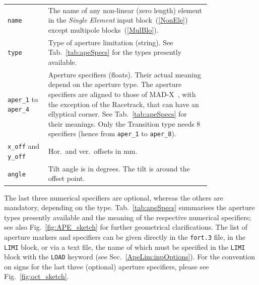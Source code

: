 \begin{longtabu}{@{}lp{0.8\linewidth}}
    \texttt{name}   & The name of any non-linear (zero length) element in the \textit{Single Element} input block~(\ref{NonEle}) except multipole blocks~(\ref{MulBlo}). \\
    \texttt{type}   & Type of aperture limitation (string). See Tab.~\ref{tab:apeSpecs} for the types
                      presently available. \\
    \texttt{aper\_1} to \texttt{aper\_4}  & Aperture specifiers (floats).
                      Their actual meaning depend on the aperture type. The aperture specifiers are
                      aligned to those of MAD-X~\cite{MAD}, with the exception of the Racetrack,
                      that can have an ellyptical corner. See Tab.~\ref{tab:apeSpecs} for their
                      meanings. Only the Transition type needs 8 specifiers (hence from \texttt{aper\_1} to \texttt{aper\_8}). \\
    \texttt{x\_off} and \texttt{y\_off}  & Hor.~and ver.~offsets in mm. \\
    \texttt{angle}  & Tilt angle is in degrees. The tilt is around the offset point.\\
\end{longtabu}

The last three numerical specifiers are optional, whereas the others are mandatory, depending on the type.
Tab.~\ref{tab:apeSpecs} summarises the aperture types presently available and the meaning of the respective numerical specifiers; see also Fig.~\ref{fig:APE_sketch} for further geometrical clarifications.
The list of aperture markers and specifiers can be given directly in the \texttt{fort.3} file, in the \texttt{LIMI} block, or via a text file, the name of which must be specified in the \texttt{LIMI} block with the \texttt{LOAD} keyword (see Sec.~\ref{ApeLim:inpOptions}).
For the convention on signs for the last three (optional) aperture specifiers, please see Fig.~\ref{fig:oct_sketch}.

